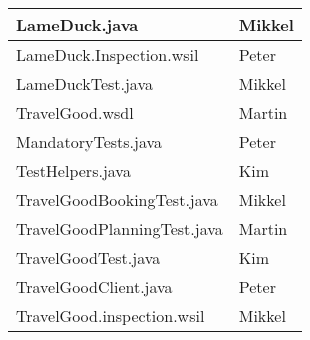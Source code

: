 \begin{tabular}{|l|l|}
\hline LameDuck.java & Mikkel \\ 
\hline LameDuck.Inspection.wsil & Peter \\ 
\hline LameDuckTest.java & Mikkel \\
\hline TravelGood.wsdl & Martin \\ 
\hline MandatoryTests.java & Peter \\  
\hline TestHelpers.java & Kim \\ 
\hline TravelGoodBookingTest.java & Mikkel \\ 
\hline TravelGoodPlanningTest.java & Martin \\ 
\hline TravelGoodTest.java & Kim \\ 
\hline TravelGoodClient.java & Peter \\ 
\hline TravelGood.inspection.wsil & Mikkel  \\ 
\hline 
\end{tabular} 

